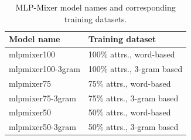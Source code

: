 \documentclass[conference]{IEEEtran}
\begin{document}
\begin{table}[!th]
	\centering
	\begin{tabularx}{0.8\textwidth}{|l|X|}
		\hline
		\textbf{Model name} & \textbf{Training dataset} \\ \hline
		mlpmixer100 & 100\% attrs., word-based \\
		mlpmixer100-3gram & 100\% attrs., 3-gram based \\ 
		mlpmixer75 & 75\% attrs., word-based \\
		mlpmixer75-3gram & 75\% attrs., 3-gram based \\ 
		mlpmixer50 & 50\% attrs., word-based \\
		mlpmixer50-3gram & 50\% attrs., 3-gram based \\ 
		\hline
	\end{tabularx}
	\caption{MLP-Mixer model names and corresponding training datasets.}
	\label{tab:trained_mlpmixer_models}
\end{table}

\end{document}
